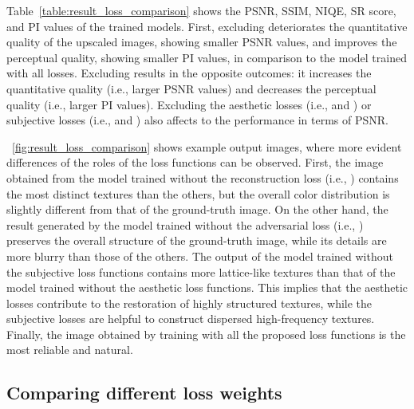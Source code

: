 \documentclass[runningheads]{llncs}
\begin{document}
Table~\ref{table:result_loss_comparison} shows the PSNR, SSIM, NIQE, SR score, and PI values of the trained models.
First, excluding  deteriorates the quantitative quality of the upscaled images, showing smaller PSNR values, and improves the perceptual quality, showing smaller PI values, in comparison to the model trained with all losses.
Excluding  results in the opposite outcomes: it increases the quantitative quality (i.e., larger PSNR values) and decreases the perceptual quality (i.e., larger PI values).
Excluding the aesthetic losses (i.e.,  and ) or subjective losses (i.e.,  and ) also affects to the performance in terms of PSNR.

\figurename~\ref{fig:result_loss_comparison} shows example output images, where more evident differences of the roles of the loss functions can be observed.
First, the image obtained from the model trained without the reconstruction loss (i.e., ) contains the most distinct textures than the others, but the overall color distribution is slightly different from that of the ground-truth image.
On the other hand, the result generated by the model trained without the adversarial loss (i.e., ) preserves the overall structure of the ground-truth image, while its details are more blurry than those of the others.
The output of the model trained without the subjective loss functions contains more lattice-like textures than that of the model trained without the aesthetic loss functions.
This implies that the aesthetic losses contribute to the restoration of highly structured textures, while the subjective losses are helpful to construct dispersed high-frequency textures.
Finally, the image obtained by training with all the proposed loss functions is the most reliable and natural.


\subsection{Comparing different loss weights}
\label{sec:comparing_different_loss_weights}
\end{document}
